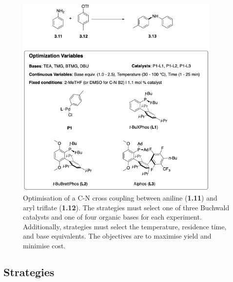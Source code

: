 \begin{figure}[p]
    \centering
    \includegraphics[width=0.9\textwidth]{gfx/Chapter03/c_n_benchmarks_thesis_2.png}
    \caption{Optimisation of a C-N cross coupling between aniline (\textbf{1.11}) and aryl triflate (\textbf{1.12}).\cite{Baumgartner2019} The strategies must select one of three Buchwald catalysts and one of four organic bases for each experiment. Additionally, strategies must select the temperature, residence time, and base equivalents. The objectives are to maximise yield and minimise cost.}
    \label{fig:benchmarks_cn_summit}
\end{figure}




\subsection{Strategies}

